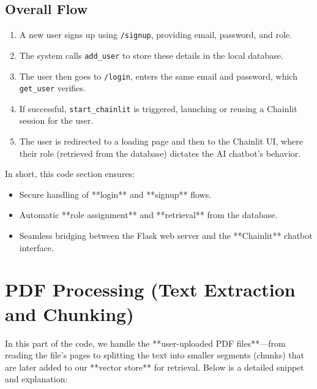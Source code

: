 \subsection{Overall Flow}
\begin{enumerate}
  \item A new user signs up using \texttt{/signup}, providing email, password, and role.
  \item The system calls \texttt{add\_user} to store these details in the local database.
  \item The user then goes to \texttt{/login}, enters the same email and password, which \texttt{get\_user} verifies.
  \item If successful, \texttt{start\_chainlit} is triggered, launching or reusing a Chainlit session for the user.
  \item The user is redirected to a loading page and then to the Chainlit UI, where their role (retrieved from the database) 
        dictates the AI chatbot’s behavior.
\end{enumerate}

\noindent
In short, this code section ensures:
\begin{itemize}
    \item Secure handling of **login** and **signup** flows.
    \item Automatic **role assignment** and **retrieval** from the database.
    \item Seamless bridging between the Flask web server and the **Chainlit** chatbot interface.
\end{itemize}

\section{PDF Processing (Text Extraction and Chunking)}
\label{sec:pdf-chunking}

In this part of the code, we handle the **user-uploaded PDF files**—from reading the file’s pages to splitting the text into smaller segments (chunks) that are later added to our **vector store** for retrieval. Below is a detailed snippet and explanation:

